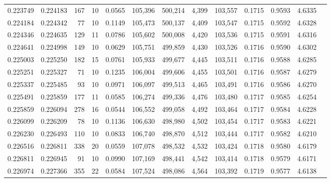\begin{tabular}{rrrrrrrrrrrrr}
0.223749 & 0.224183 &   167 &  10 &                                     0.0565 & 105,396 & 500,214 &   4,399 & 103,557 & 0.1715 & 0.9593 & 4.6335 \\
0.224184 & 0.224342 &    77 &  10 &                                     0.1149 & 105,473 & 500,137 &   4,409 & 103,547 & 0.1715 & 0.9592 & 4.6328 \\
0.224346 & 0.224635 &   129 &  11 &                                     0.0786 & 105,602 & 500,008 &   4,420 & 103,536 & 0.1715 & 0.9591 & 4.6316 \\
0.224641 & 0.224998 &   149 &  10 &                                     0.0629 & 105,751 & 499,859 &   4,430 & 103,526 & 0.1716 & 0.9590 & 4.6302 \\
0.225003 & 0.225250 &   182 &  15 &                                     0.0761 & 105,933 & 499,677 &   4,445 & 103,511 & 0.1716 & 0.9588 & 4.6285 \\
0.225251 & 0.225327 &    71 &  10 &                                     0.1235 & 106,004 & 499,606 &   4,455 & 103,501 & 0.1716 & 0.9587 & 4.6279 \\
0.225337 & 0.225485 &    93 &  10 &                                     0.0971 & 106,097 & 499,513 &   4,465 & 103,491 & 0.1716 & 0.9586 & 4.6270 \\
0.225491 & 0.225859 &   177 &  11 &                                     0.0585 & 106,274 & 499,336 &   4,476 & 103,480 & 0.1717 & 0.9585 & 4.6254 \\
0.225859 & 0.226094 &   278 &  16 &                                     0.0544 & 106,552 & 499,058 &   4,492 & 103,464 & 0.1717 & 0.9584 & 4.6228 \\
0.226099 & 0.226209 &    78 &  10 &                                     0.1136 & 106,630 & 498,980 &   4,502 & 103,454 & 0.1717 & 0.9583 & 4.6221 \\
0.226230 & 0.226493 &   110 &  10 &                                     0.0833 & 106,740 & 498,870 &   4,512 & 103,444 & 0.1717 & 0.9582 & 4.6210 \\
0.226516 & 0.226811 &   338 &  20 &                                     0.0559 & 107,078 & 498,532 &   4,532 & 103,424 & 0.1718 & 0.9580 & 4.6179 \\
0.226811 & 0.226945 &    91 &  10 &                                     0.0990 & 107,169 & 498,441 &   4,542 & 103,414 & 0.1718 & 0.9579 & 4.6171 \\
0.226974 & 0.227366 &   355 &  22 &                                     0.0584 & 107,524 & 498,086 &   4,564 & 103,392 & 0.1719 & 0.9577 & 4.6138 \\

\end{tabular}
